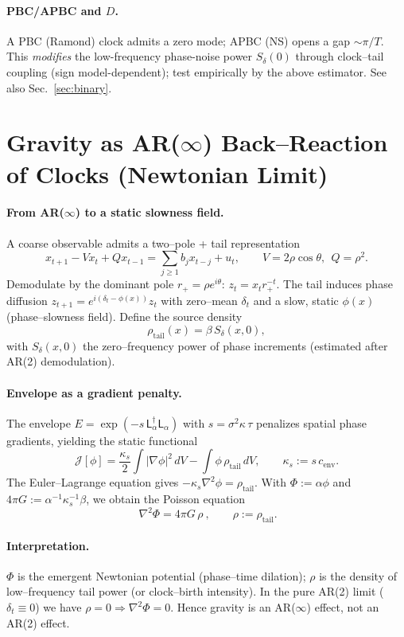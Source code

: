 \documentclass[11pt]{article}
\newcommand{\Lap}{\mathsf{L}_\alpha}
\begin{document}
\paragraph{PBC/APBC and $D$.}
A PBC (Ramond) clock admits a zero mode; APBC (NS) opens a gap $\sim\pi/T$. This \emph{modifies} the low-frequency phase-noise power $S_\delta(0)$ through clock--tail coupling (sign model-dependent); test empirically by the above estimator. See also Sec.~\ref{sec:binary}.

\section{Gravity as AR($\infty$) Back–Reaction of Clocks (Newtonian Limit)}
\label{sec:gravity-arinfty}

\paragraph{From AR($\infty$) to a static slowness field.}
A coarse observable admits a two–pole + tail representation
\[
x_{t+1}-Vx_t+Qx_{t-1}=\sum_{j\ge1} b_j x_{t-j}+u_t,\qquad
V=2\rho\cos\theta,\ \ Q=\rho^2.
\]
Demodulate by the dominant pole \(r_+=\rho e^{i\theta}\): \(z_t=x_t r_+^{-t}\).
The tail induces phase diffusion \(z_{t+1}=e^{i(\delta_t-\phi(x))}z_t\) with zero–mean \(\delta_t\) and a slow, static
\(\phi(x)\) (phase–slowness field). Define the source density
\[
\rho_{\text{tail}}(x)=\beta\,S_\delta(x,0),
\]
with \(S_\delta(x,0)\) the zero–frequency power of phase increments (estimated after AR(2) demodulation).

\paragraph{Envelope as a gradient penalty.}
The envelope \(E=\exp(-s\,\Lap^\dagger\Lap)\) with \(s=\sigma^2\kappa\,\tau\) penalizes spatial phase gradients, yielding the static functional
\[
\mathcal J[\phi]=\frac{\kappa_s}{2}\int |\nabla\phi|^2\,dV-\int \phi\,\rho_{\text{tail}}\,dV,\qquad
\kappa_s:=s\,c_{\mathrm{env}}.
\]
The Euler–Lagrange equation gives \(-\kappa_s\nabla^2\phi=\rho_{\text{tail}}\).
With \(\Phi:=\alpha\phi\) and \(4\pi G:=\alpha^{-1}\kappa_s^{-1}\beta\), we obtain the Poisson equation
\[
\boxed{~\nabla^2\Phi=4\pi G\,\rho~,}\qquad \rho:=\rho_{\text{tail}}.
\]

\paragraph{Interpretation.}
\(\Phi\) is the emergent Newtonian potential (phase–time dilation);
\(\rho\) is the density of low–frequency tail power (or clock–birth intensity).
In the pure AR(2) limit (\(\delta_t\equiv0\)) we have \(\rho=0\Rightarrow \nabla^2\Phi=0\).
Hence gravity is an AR($\infty$) effect, not an AR(2) effect.
\end{document}
